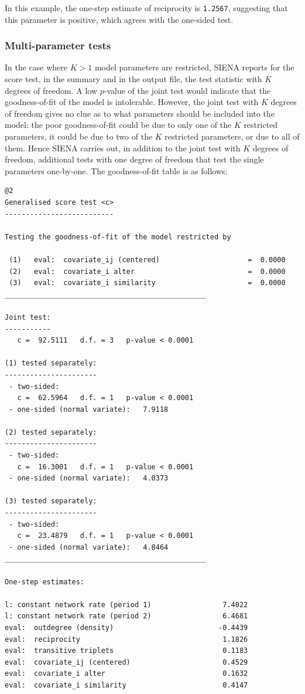\documentclass[a4paper,fleqn,11pt]{article}
\newcommand{\+}{\, + \,}
\newcommand{\sfn}[1]{\textsf{#1}}
\newcommand{\SI}{{\sf SIENA }}
\begin{document}
In this example, the one-step estimate of reciprocity is {\tt 1.2567},
suggesting that this parameter is positive, which agrees with the one-sided test.

\subsubsection{Multi-parameter tests}

In the case where $K > 1$ model parameters are restricted, \SI
reports for the score test, in the \sfn{summary} and in the output file,
the test statistic with $K$ degrees of freedom. A low
$p$-value of the joint test would indicate that the
goodness-of-fit of the model is intolerable. However, the joint
test with $K$ degrees of freedom gives no clue as to what parameters
should be included into the model: the poor goodness-of-fit could be
due to only one of the $K$ restricted parameters, it could be due to
two of the $K$ restricted parameters, or due to all of them. Hence
\SI carries out, in addition to the joint test with $K$ degrees of
freedom, additional tests with one degree of freedom that test the
single parameters one-by-one. The goodness-of-fit table is as
follows:

{\footnotesize
\begin{verbatim}
@2
Generalised score test <c>
--------------------------

Testing the goodness-of-fit of the model restricted by

 (1)   eval:  covariate_ij (centered)                     =  0.0000
 (2)   eval:  covariate_i alter                           =  0.0000
 (3)   eval:  covariate_i similarity                      =  0.0000
________________________________________________

Joint test:
-----------
   c =  92.5111   d.f. = 3   p-value < 0.0001

(1) tested separately:
----------------------
 - two-sided:
   c =  62.5964   d.f. = 1   p-value < 0.0001
 - one-sided (normal variate):   7.9118

(2) tested separately:
----------------------
 - two-sided:
   c =  16.3001   d.f. = 1   p-value < 0.0001
 - one-sided (normal variate):   4.0373

(3) tested separately:
----------------------
 - two-sided:
   c =  23.4879   d.f. = 1   p-value < 0.0001
 - one-sided (normal variate):   4.8464
________________________________________________

One-step estimates:

l: constant network rate (period 1)                 7.4022
l: constant network rate (period 2)                 6.4681
eval:  outdegree (density)                         -0.4439
eval:  reciprocity                                  1.1826
eval:  transitive triplets                          0.1183
eval:  covariate_ij (centered)                      0.4529
eval:  covariate_i alter                            0.1632
eval:  covariate_i similarity                       0.4147
\end{verbatim}
}
\end{document}
